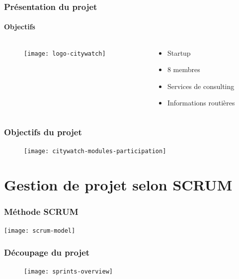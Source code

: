 \documentclass{beamer}
\begin{document}
\begin{frame}
    \frametitle{Présentation du projet}
    \framesubtitle{Objectifs}
    \begin{columns}
        \begin{column}{0.5\textwidth}
            \begin{figure}
                \texttt{[image: logo-citywatch]}
            \end{figure}
        \end{column}
        \begin{column}{0.5\textwidth}
            \begin{itemize}
                \item Startup
                \item 8 membres
                \item Services de consulting
                \item Informations routières
            \end{itemize}
        \end{column}
    \end{columns}
\end{frame}

\begin{frame}
    \frametitle{Objectifs du projet}
    \begin{figure}
        \centering
        \texttt{[image: citywatch-modules-participation]}
    \end{figure}
\end{frame}

\section{Gestion de projet selon SCRUM}


\begin{frame}
    \frametitle{Méthode SCRUM}
    \centering
    \texttt{[image: scrum-model]}
\end{frame}

\begin{frame}
\frametitle{Découpage du projet}
\begin{figure}
    \texttt{[image: sprints-overview]}
\end{figure}
\end{frame}
\end{document}

